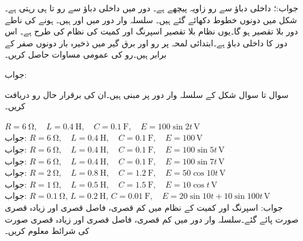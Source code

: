 جواب:؛ داخلی دباؤ سے رو  زاویہ پیچھے ہے۔ دور میں داخلی دباؤ سے رو  تا   ہی رہتی ہے۔شکل  میں دونوں خطوط دکھائے گئے ہیں۔
سلسلہ وار  دور میں  اور  ہیں۔ ہونے کی ناطے  دور بلا تقصیر ہو گا۔یوں  نظام بلا تقصیر اسپرنگ اور کمیت  کی نظام کی طرح ہے۔ اس دور کا داخلی دباؤ  ہے۔ابتدائی لمحہ  پر رو اور برق گیر میں ذخیرہ بار دونوں صفر کے برابر ہیں۔رو کی عمومی مساوات حاصل کریں۔

جواب: 

سوال  تا سوال   شکل  کے سلسلہ وار  دور پر مبنی ہیں۔ان کی برقرار حال رو دریافت کریں۔

\quad
$R=\SI{6}{\ohm}, \quad L=\SI{0.4}{\henry}, \quad C=\SI{0.1}{\farad}, \quad E=100\sin 2t\,\si{\volt}$\\
جواب:
\quad
$R=\SI{6}{\ohm}, \quad L=\SI{0.4}{\henry}, \quad C=\SI{0.1}{\farad}, \quad E=100\,\si{\volt}$\\
جواب:
\quad
$R=\SI{6}{\ohm}, \quad L=\SI{0.4}{\henry}, \quad C=\SI{0.1}{\farad}, \quad E=100\sin 5t\,\si{\volt}$\\
جواب:
\quad
$R=\SI{6}{\ohm}, \quad L=\SI{0.4}{\henry}, \quad C=\SI{0.1}{\farad}, \quad E=100\sin 7t\,\si{\volt}$\\
جواب:
\quad
$R=\SI{2}{\ohm}, \quad L=\SI{0.8}{\henry}, \quad C=\SI{1.2}{\farad}, \quad E=50\cos 10t\,\si{\volt}$\\
جواب:
\quad
$R=\SI{1}{\ohm}, \quad L=\SI{0.5}{\henry}, \quad C=\SI{1.5}{\farad}, \quad E=10\cos t\,\si{\volt}$\\
جواب:
\quad
$R=\SI{0.1}{\ohm}, \, L=\SI{0.2}{\henry}, \, C=\SI{0.01}{\farad}, \quad E=20\sin 10t+10\sin 100t\,\si{\volt}$\\
جواب:
اسپرنگ اور  کمیت کے نظام میں کم قصری، فاصل قصری اور زیادہ قصری صورت پائے گئے۔سلسلہ وار  دور میں کم قصری، فاصل قصری اور زیادہ قصری صورت کی شرائط معلوم کریں۔

